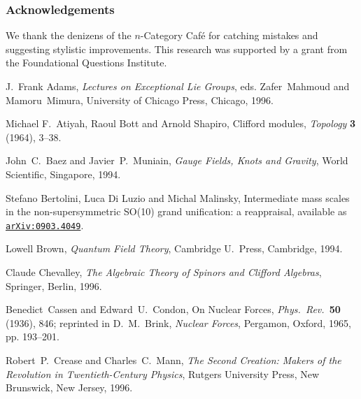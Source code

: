\documentclass[12pt]{article}
\begin{document}
\subsubsection*{Acknowledgements}

We thank the denizens of the $n$-Category Caf\'e for catching mistakes
and suggesting stylistic improvements.  This research was supported by
a grant from the Foundational Questions Institute.

\begin{thebibliography}{99}

J.\ Frank Adams, {\em {Lectures on Exceptional Lie Groups}},  eds. Zafer\ Mahmoud
and Mamoru\ Mimura, University of Chicago Press, Chicago, 1996.

Michael F.\ Atiyah, Raoul Bott and Arnold Shapiro, Clifford modules,
{\em Topology} {\bf 3} (1964), 3--38. 

John\ C.\ Baez and Javier\ P.\ Muniain, {\em {Gauge Fields, Knots and
Gravity}}, World Scientific, Singapore, 1994.

Stefano Bertolini, Luca Di Luzio and Michal Malinsky, 
Intermediate mass scales in the non-supersymmetric SO(10) grand 
unification: a reappraisal, available as
\href{http://arxiv.org/abs/hep-ph/0903.4049}
{\texttt{arXiv:0903.4049}}. 

Lowell Brown, {\em {Quantum Field Theory}}, Cambridge U.\ Press, Cambridge,
1994.  

 Claude Chevalley, {\em {The Algebraic Theory of
Spinors and Clifford Algebras}}, Springer, Berlin, 1996.

Benedict\ Cassen and Edward\ U.\ Condon, On Nuclear Forces, 
{\em {Phys.\ Rev.\ }}{\bf 50} (1936), 846; reprinted in 
D.\ M.\ Brink, {\em {Nuclear Forces}}, Pergamon, Oxford, 1965, pp. 193--201.

Robert\ P.\ Crease and Charles\ C.\ Mann, {\em {The Second Creation: Makers of
the Revolution in Twentieth-Century Physics}}, Rutgers University Press, New
Brunswick, New Jersey, 1996.


\end{thebibliography}
\end{document}
